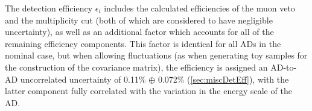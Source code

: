 \documentclass[../thesis.tex]{subfiles}
\begin{document}
The detection efficiency $\epsilon_i$ includes the calculated efficiencies of the muon veto and the multiplicity cut (both of which are considered to have negligible uncertainty), as well as an additional factor which accounts for all of the remaining efficiency components. This factor is identical for all ADs in the nominal case, but when allowing fluctuations (as when generating toy samples for the construction of the covariance matrix), the efficiency is assigned an AD-to-AD uncorrelated uncertainty of 0.11\% $\oplus$ 0.072\% (\autoref{sec:miscDetEff}), with the latter component fully correlated with the variation in the energy scale of the AD.
\end{document}
